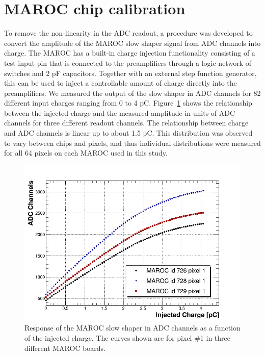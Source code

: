 \section{MAROC chip calibration}

To remove the non-linearity in the ADC readout, a procedure was developed to convert the amplitude of the MAROC slow shaper signal from ADC channels into charge. The MAROC has a built-in charge injection functionality consisting of a test input pin that is connected to the preamplifiers through a logic network of switches and 2 pF capacitors.
Together with an external step function generator, this can be used to inject a controllable amount of charge directly into the preamplifiers. We measured the output of the slow shaper in ADC channels for 82 different input charges ranging from 0 to 4 pC.
Figure~\ref{fig:MAROCcalib} shows the relationship between the injected charge and the measured amplitude in units of ADC channels for three different readout channels. The relationship between charge and ADC channels is linear up to about 1.5 pC.
This distribution was observed to vary between chips and pixels, and thus individual distributions were measured for all 64 pixels on each MAROC used in this study. 

\begin{figure}[hbt]
	\centering
	\includegraphics[width=\linewidth]{figures/adc_v_charge.png}
	\caption{Response of the MAROC slow shaper in ADC channels as a function of the injected charge. The curves shown are for pixel \#1 in three different MAROC boards.}
	\label{fig:MAROCcalib}
\end{figure}

